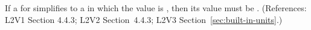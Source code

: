 If a \UnitDefinition for  simplifies to a \Unit in which the
  value is , then its
  value must be .  (References:
L2V1 Section 4.4.3; L2V2 Section~4.4.3; L2V3
Section~\ref{sec:built-in-units}.)
